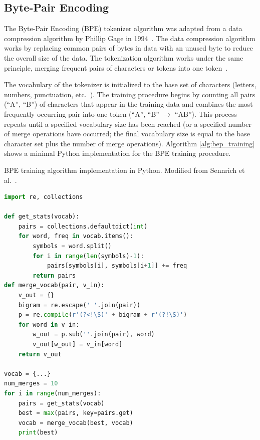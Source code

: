 \documentclass[12pt]{article}
\begin{document}
\subsection{Byte-Pair Encoding}\label{sec:bpe}
The Byte-Pair Encoding (BPE) tokenizer algorithm was adapted from a data compression algorithm by Phillip Gage in 1994~\cite{gage_feb94_1994}. The
data compression algorithm works by replacing common pairs of bytes in data with an unused byte to reduce the overall size of the data. The
tokenization algorithm works under the same principle, merging frequent pairs of characters or tokens into one token~\cite{sennrich_neural_2016}.

The vocabulary of the tokenizer is initialized to the base set of characters (letters, numbers, punctuation, etc.~). The training procedure begins by
counting all pairs (``A'', ``B'') of characters that appear in the training data and combines the most frequently occurring pair into one token
(``A'', ``B'' $\rightarrow$ ``AB''). This process repeats until a specified vocabulary size has been reached (or a specified number of merge
operations have occurred; the final vocabulary size is equal to the base character set plus the number of merge operations). Algorithm
\ref{alg:bep_training} shows a minimal Python implementation for the BPE training procedure.

\begin{algorithm}[!t]
    \caption{BPE training algorithm implementation in Python. Modified from Sennrich et al.~\cite{sennrich_neural_2016}.}
    \label{alg:bep_training}
    \begin{lstlisting}[language=Python]
import re, collections

def get_stats(vocab):
    pairs = collections.defaultdict(int)
    for word, freq in vocab.items():
        symbols = word.split()
        for i in range(len(symbols)-1):
            pairs[symbols[i], symbols[i+1]] += freq
        return pairs
def merge_vocab(pair, v_in):
    v_out = {}
    bigram = re.escape(' '.join(pair))
    p = re.compile(r'(?<!\S)' + bigram + r'(?!\S)')
    for word in v_in:
        w_out = p.sub(''.join(pair), word)
        v_out[w_out] = v_in[word]
    return v_out

vocab = {...}
num_merges = 10
for i in range(num_merges):
    pairs = get_stats(vocab)
    best = max(pairs, key=pairs.get)
    vocab = merge_vocab(best, vocab)
    print(best)
    \end{lstlisting}
\end{algorithm}
\end{document}
